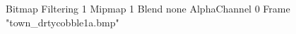 {Bitmap
	{Filtering 1}
	{Mipmap 1}
	{Blend none}
	{AlphaChannel 0}
	{Frame "town_drtycobble1a.bmp"}
}
